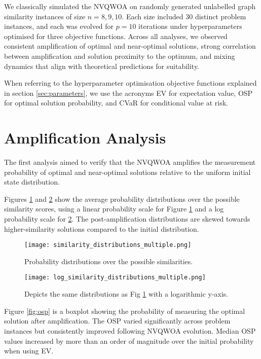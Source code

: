 We classically simulated the NVQWOA on randomly generated unlabelled graph similarity instances of size $n=8,9,10$. Each size included 30 distinct problem instances, and each was evolved for $p=10$ iterations under hyperparameters optimised for three objective functions. Across all analyses, we observed consistent amplification of optimal and near-optimal solutions, strong correlation between amplification and solution proximity to the optimum, and mixing dynamics that align with theoretical predictions for suitability.

When referring to the hyperparameter optimisation objective functions explained in section \ref{sec:parameters}, we use the acronyms EV for expectation value, OSP for optimal solution probability, and CVaR for conditional value at risk.

\section{Amplification Analysis}
The first analysis aimed to verify that the NVQWOA amplifies the measurement probability of optimal and near-optimal solutions relative to the uniform initial state distribution. 

Figures \ref{fig:similarity dist} and \ref{fig:similarity log dist} show the average probability distributions over the possible similarity scores, using a linear probability scale for Figure \ref{fig:similarity dist} and a log probability scale for \ref{fig:similarity log dist}. The post-amplification distributions are skewed towards higher-similarity solutions compared to the initial distribution.


\begin{figure}[htbp]
    \centering
    \texttt{[image: similarity\_distributions\_multiple.png]} 
    \caption{Probability distributions over the possible similarities.}
    \label{fig:similarity dist}
\end{figure}

\begin{figure}[htbp]
    \centering
    \texttt{[image: log\_similarity\_distributions\_multiple.png]} 
    \caption{Depicts the same distributions as Fig \ref{fig:similarity dist} with a logarithmic y-axis.}
    \label{fig:similarity log dist}
\end{figure}

Figure \ref{fig:osp} is a boxplot showing the probability of measuring the optimal solution after amplification. The OSP varied significantly across problem instances but consistently improved following NVQWOA evolution. Median OSP values increased by more than an order of magnitude over the initial probability when using EV.

